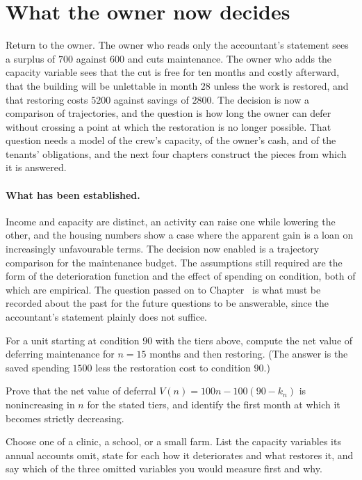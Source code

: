\section{What the owner now decides}

Return to the owner. The owner who reads only the accountant's statement sees a surplus of $700$ against $600$ and cuts maintenance. The owner who adds the capacity variable sees that the cut is free for ten months and costly afterward, that the building will be unlettable in month $28$ unless the work is restored, and that restoring costs $5200$ against savings of $2800$. The decision is now a comparison of trajectories, and the question is how long the owner can defer without crossing a point at which the restoration is no longer possible. That question needs a model of the crew's capacity, of the owner's cash, and of the tenants' obligations, and the next four chapters construct the pieces from which it is answered.

\paragraph{What has been established.} Income and capacity are distinct, an activity can raise one while lowering the other, and the housing numbers show a case where the apparent gain is a loan on increasingly unfavourable terms. The decision now enabled is a trajectory comparison for the maintenance budget. The assumptions still required are the form of the deterioration function and the effect of spending on condition, both of which are empirical. The question passed on to Chapter~ is what must be recorded about the past for the future questions to be answerable, since the accountant's statement plainly does not suffice.

\begin{exercise}
For a unit starting at condition $90$ with the tiers above, compute the net value of deferring maintenance for $n=15$ months and then restoring. (The answer is the saved spending $1500$ less the restoration cost to condition $90$.)
\end{exercise}
\begin{exercise}
Prove that the net value of deferral $V(n)=100n-100(90-k_n)$ is nonincreasing in $n$ for the stated tiers, and identify the first month at which it becomes strictly decreasing.
\end{exercise}
\begin{exercise}
Choose one of a clinic, a school, or a small farm. List the capacity variables its annual accounts omit, state for each how it deteriorates and what restores it, and say which of the three omitted variables you would measure first and why.
\end{exercise}


